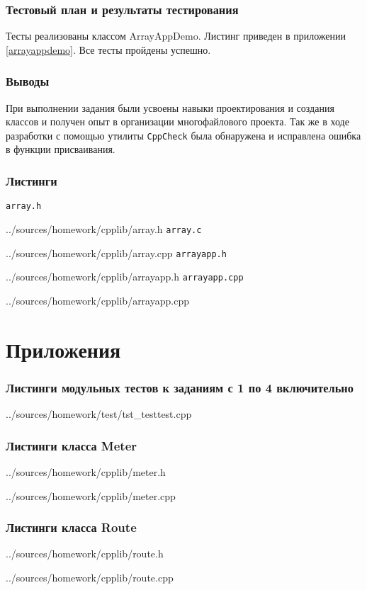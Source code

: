 \documentclass[12pt,a4paper]{report}
\begin{document}
\subsection{Тестовый план и результаты тестирования}
Тесты реализованы классом ArrayAppDemo. Листинг приведен в приложении \ref{arrayappdemo}. Все тесты пройдены успешно.
\subsection{Выводы}
\hspace{\parindent}При выполнении задания были усвоены навыки проектирования и создания классов и получен опыт в организации многофайлового проекта. Так же в ходе разработки с помощью утилиты \verb+CppCheck+ была обнаружена и исправлена ошибка в функции присваивания.

\newpage
\subsection{Листинги}
\verb+array.h+

{../sources/homework/cpplib/array.h}
\verb+array.c+

{../sources/homework/cpplib/array.cpp}
\verb+arrayapp.h+

{../sources/homework/cpplib/arrayapp.h}
\verb+arrayapp.cpp+

{../sources/homework/cpplib/arrayapp.cpp}




\chapter*{Приложения}
\subsection*{Листинги модульных тестов к заданиям с 1 по 4 включительно}

{../sources/homework/test/tst_testtest.cpp}
\newpage

\subsection*{Листинги класса Meter}

{../sources/homework/cpplib/meter.h}

{../sources/homework/cpplib/meter.cpp}
\newpage

\subsection*{Листинги класса Route}

{../sources/homework/cpplib/route.h}

{../sources/homework/cpplib/route.cpp}
\newpage
\end{document}
